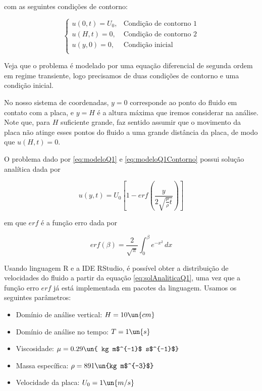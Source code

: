 \noindent com as seguintes condições de contorno:

\begin{equation}\label{eq:modeloQ1Contorno}
    \begin{cases}
        u(0, t) = U_0, & \textrm{Condição de contorno 1} \\
        u(H, t) = 0,   & \textrm{Condição de contorno 2} \\
        u(y, 0) =  0,  & \textrm{Condição inicial}       \\
    \end{cases}
\end{equation}

Veja que o problema é modelado por uma equação diferencial de segunda ordem 
em regime transiente, logo precisamos de duas condições de contorno e uma condição 
inicial.

No nosso sistema de coordenadas, $y = 0$ corresponde ao ponto do fluido
em contato com a placa, e $y = H$ é a altura máxima que iremos considerar na análise.
Note que, para $H$ suficiente grande, faz sentido assumir que o movimento da placa
não atinge esses pontos do fluido a uma grande distância da placa, de modo que
$u(H, t) = 0$.

O problema dado por \eqref{eq:modeloQ1} e \eqref{eq:modeloQ1Contorno} possui solução analítica dada por

\begin{equation}\label{eq:solAnaliticaQ1}
    u(y,t) = U_0 \left[1 - erf\left(\frac{y}{2\sqrt{\frac{\mu}{\rho}t}}\right)\right]
\end{equation}

\noindent em que $erf$ é a função erro dada por

\begin{equation}\label{eq:erf}
    erf(\beta) = \frac{2}{\sqrt{\pi}} \int_0^\beta e^{-x^2} \, dx
\end{equation}

Usando linguagem R e a IDE RStudio,
é possível obter a distribuição de velocidades do fluido
a partir da equação \eqref{eq:solAnaliticaQ1}, uma vez que a função erro $erf$
já está implementada em pacotes da linguagem. Usamos os seguintes parâmetros:

\begin{itemize}
    \item Domínio de análise vertical: $H=10 \un{cm}$
    \item Domínio de análise no tempo: $T=1 \un{s}$
    \item Viscosidade: $\mu=0.29 \un{ kg m$^{-1}$ s$^{-1}$}$
    \item Massa específica: $\rho=891 \un{kg m$^{-3}$}$
    \item Velocidade da placa: $U_0 = 1 \un{m/s}$
\end{itemize}

